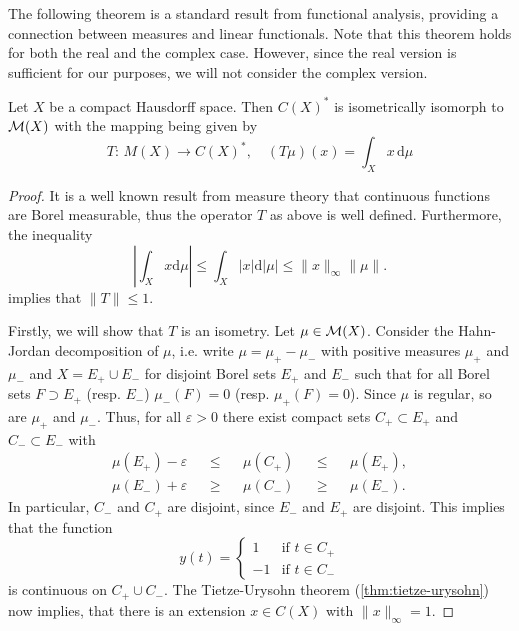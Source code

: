 The following theorem is a standard result from functional analysis, providing a connection between measures and linear functionals. Note that this theorem holds for both the real and the complex case. However, since the real version is sufficient for our purposes, we will not consider the complex version.
\begin{theorem}\label{thm:riesz}
	Let $X$ be a compact Hausdorff space. Then $C(X)^\ast$ is isometrically isomorph to $\mathcal{M}(X)$ with the mapping being given by
	\[
	T:\, M(X)\to C(X)^\ast,\quad (T\mu)(x)=\int_Xx\,\mathrm{d}\mu
	\]
\end{theorem}
\begin{proof}
	It is a well known result from measure theory that continuous functions are Borel measurable, thus the operator $T$ as above is well defined. Furthermore, the inequality \[
	\left|\int_X x\mathrm{d}\mu\right|\leq \int_X|x|\mathrm{d}|\mu|\leq \|x\|_\infty\|\mu\|.
	\]
	implies that $\|T\|\leq 1$.
	
	Firstly, we will show that $T$ is an isometry. Let $\mu\in\mathcal{M}(X)$. Consider the Hahn-Jordan decomposition of $\mu$, i.e. write $\mu=\mu_+ -\mu_-$ with positive measures $\mu_+ $ and $\mu_-$ and $X=E_+\cup E_-$ for disjoint Borel sets $E_+$ and $E_-$ such that for all Borel sets $F\supset E_+$ (resp. $E_-$) $\mu_-(F)=0$ (resp. $\mu_+(F)=0$). Since $\mu$ is regular, so are $\mu_+$ and $\mu_-$. Thus, for all $\varepsilon>0$ there exist compact sets $C_+\subset E_+$ and $C_-\subset E_-$ with
	\begin{align*}
		\mu(E_+)-\varepsilon&&\leq&&\mu(C_+)&&\leq&& \mu(E_+),\\
		\mu(E_-)+\varepsilon&&\geq&&\mu(C_-)&&\geq&& \mu(E_-).
	\end{align*}
	In particular, $C_-$ and $C_+$ are disjoint, since $E_-$ and $E_+$ are disjoint. This implies that the function
	\[
	y(t)=\begin{cases}
	1&\text{if }t\in C_+\\
	-1&\text{if } t\in C_-
	\end{cases}
	\]
	is continuous on $C_+\cup C_-$. The Tietze-Urysohn theorem (\autoref{thm:tietze-urysohn}) now implies, that there is an extension $x\in C(X)$ with $\|x\|_\infty=1$. %
	

\end{proof}
